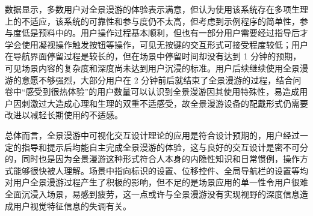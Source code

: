 数据显示，多数用户对全景漫游的体验表示满意，但认为使用该系统存在多项生理上的不适应，该系统的可靠性和参与度仍不太高，但考虑到示例程序的简单性，参与度低是预料中的。用户操作过程基本顺利，但也有一部分用户需要经过指导后才学会使用凝视操作触发按钮等操作，可见无按键的交互形式可接受程度较低；用户在导航界面停留过程是较长的，但在场景中停留时间却没有达到 1 分钟的预期，可见场景内容的复杂度和深度尚未达到用户沉浸的标准。用户后续继续使用全景漫游的意愿不够强烈，大部分用户在 2 分钟前后就结束了全景漫游的过程，结合问卷中“感受到很热体验”的用户数量可以认识到全景漫游因其使用特殊性，易造成用户因刺激过大造成心理和生理的双重不适感受，故全景漫游设备的配戴形式仍需要改进以减轻长期使用的不适感。

总体而言，全景漫游中可视化交互设计理论的应用是符合设计预期的，用户经过一定的指导和提示后均能自主完成全景漫游的体验，这与良好的交互设计是密不可分的，同时也是因为全景漫游这种形式符合人本身的内隐性知识和日常惯例，操作方式能够很快被人理解。场景中指向标识的设置、位移控件、全局导航栏的设置等均对用户全景漫游过程产生了积极的影响，但不足的是场景应用的单一性令用户很难全面沉浸入场景，易感到疲劳，这一点或许与全景漫游没有实现视野的深度信息造成用户视觉特征信息的失调有关。